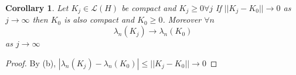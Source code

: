 \documentclass{article}
\newtheorem{Coro}{Corollary}[Thm]
\newcommand{\LL}{\mathcal{L}}
\begin{document}
\begin{Coro}
	Let $K_j\in \LL(H)$ be compact and $K_j\geq 0 \forall j$ If $||K_j-K_0||\rightarrow 0$ as $j\rightarrow \infty$ then $K_0$ is also compact and $K_0\geq 0$. Moreover $\forall n$
	\[\lambda_n(K_j)\rightarrow \lambda_n(K_0)\]
	as $j\rightarrow \infty$ 
\end{Coro}
\begin{proof}
	By (b), $|\lambda_n(K_j)-\lambda_n(K_0)|\leq ||K_j-K_0||\rightarrow 0$
\end{proof}
\end{document}
